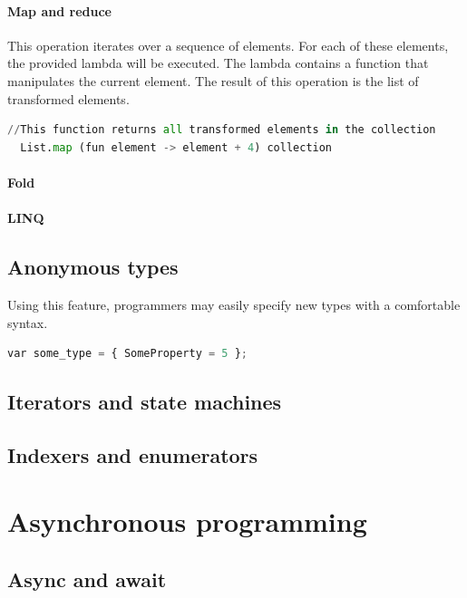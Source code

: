 \documentclass{article}
\begin{document}
\paragraph{Map and reduce}
This operation iterates over a sequence of elements. For each of these elements, the provided lambda will be executed.
The lambda contains a function that manipulates the current element. The result of this operation is the list of transformed elements.

\begin{lstlisting}[language=Python]
  //This function returns all transformed elements in the collection
  List.map (fun element -> element + 4) collection
\end{lstlisting}
  
\paragraph{Fold}

\paragraph{LINQ}


\subsection{Anonymous types}
Using this feature, programmers may easily specify new types with a comfortable syntax.

\begin{lstlisting}[language=Python]
  var some_type = { SomeProperty = 5 };
\end{lstlisting}

\subsection{Iterators and state machines}


\subsection{Indexers and enumerators}

\newpage

\section{Asynchronous programming}
\subsection{Async and await}
\end{document}
